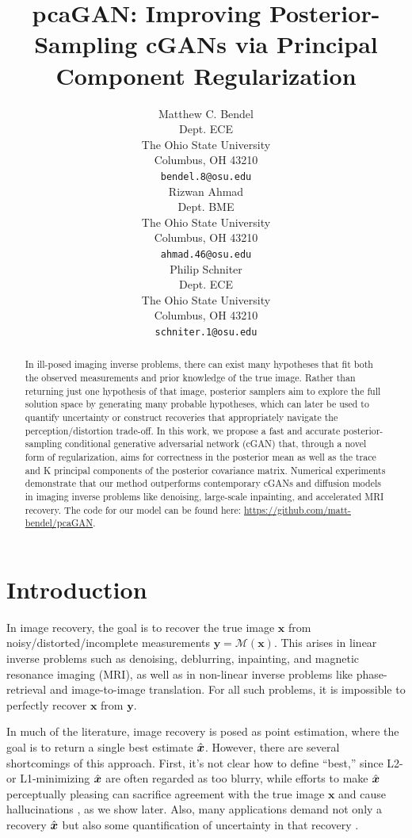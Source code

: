\documentclass{article}
\title{pcaGAN: Improving Posterior-Sampling cGANs via Principal Component Regularization}
\author{%
  Matthew C. Bendel \\
  Dept. ECE\\
  The Ohio State University\\
  Columbus, OH 43210 \\
  \texttt{bendel.8@osu.edu} \\
  \And
  Rizwan Ahmad \\
  Dept. BME\\
  The Ohio State University\\
  Columbus, OH 43210 \\
  \texttt{ahmad.46@osu.edu} \\
  \And
  Philip Schniter \\
  Dept. ECE\\
  The Ohio State University\\
  Columbus, OH 43210 \\
  \texttt{schniter.1@osu.edu} \\
}
\theoremstyle{plain}
\theoremstyle{definition}
\theoremstyle{remark}
\newcommand{\hvec}[1]{\ensuremath{\Hat{\boldsymbol{#1}}}}
\renewcommand{\vec}[1]{\ensuremath{\boldsymbol{#1}}}
\newcommand{\mc}[1]{\ensuremath{\mathcal{#1}}}
\begin{document}
\maketitle


\begin{abstract}
In ill-posed imaging inverse problems, there can exist many hypotheses that fit both the observed measurements and prior knowledge of the true image. 
Rather than returning just one hypothesis of that image, posterior samplers aim to explore the full solution space by generating many probable hypotheses, which can later be used to quantify uncertainty or construct recoveries that appropriately navigate the perception/distortion trade-off.
In this work, we propose a fast and accurate posterior-sampling conditional generative adversarial network (cGAN) that, through a novel form of regularization, aims for correctness in the posterior mean as well as the trace and K principal components of the posterior covariance matrix.
Numerical experiments demonstrate that our method outperforms contemporary cGANs and diffusion models in imaging inverse problems like denoising, large-scale inpainting, and accelerated MRI recovery. The code for our model can be found here: \url{https://github.com/matt-bendel/pcaGAN}.
\end{abstract}

\section{Introduction} \label{sec:intro}
In image recovery, the goal is to recover the true image $\vec{x}$ from noisy/distorted/incomplete measurements $\vec{y}=\mc{M}(\vec{x})$.
This arises in linear inverse problems such as denoising, deblurring, inpainting, and magnetic resonance imaging (MRI), 
as well as in non-linear inverse problems like phase-retrieval and image-to-image translation.
For all such problems, it is impossible to perfectly recover $\vec{x}$ from $\vec{y}$.

In much of the literature, image recovery is posed as point estimation, where the goal is to return a single best estimate $\hvec{x}$.
However, there are several shortcomings of this approach.
First, it's not clear how to define ``best,'' since L2- or L1-minimizing $\hvec{x}$ are often regarded as too blurry, while efforts to make $\hvec{x}$ perceptually pleasing can sacrifice agreement with the true image $\vec{x}$ and cause hallucinations \cite{Belthangady:NMe:19,Hoffman:NMe:21,Muckley:TMI:21,Bhadra:TMI:21,Gottschling:23}, as we show later. Also, many applications demand not only a recovery $\hvec{x}$ but also some quantification of uncertainty in that recovery \cite{Abdar:IF:21,Lambert:AIMed:24}.
\end{document}
